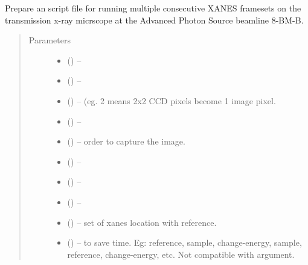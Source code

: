 \documentclass[letterpaper,10pt,english]{sphinxmanual}
\begin{document}
\begin{fulllineitems}
\label{\detokenize{xanespy:xanespy.beamlines.sector8_xanes_script}}
Prepare an script file for running multiple consecutive XANES
framesets on the transmission x-ray micrscope at the Advanced
Photon Source beamline 8-BM-B.
\begin{quote}\begin{description}
\item[{Parameters}] \leavevmode\begin{itemize}
\item {} 
 (\sphinxstyleliteralemphasis{-}) -- 

\item {} 
 (\sphinxstyleliteralemphasis{-}) -- 

\item {} 
 (\sphinxstyleliteralemphasis{-}) -- (eg. 2 means 2x2 CCD pixels become 1 image pixel.

\item {} 
 (\sphinxstyleliteralemphasis{-}) -- 

\item {} 
 (\sphinxstyleliteralemphasis{-}) -- order to capture the image.

\item {} 
 (\sphinxstyleliteralemphasis{-}) -- 

\item {} 
 (\sphinxstyleliteralemphasis{-}) -- 

\item {} 
 (\sphinxstyleliteralemphasis{-}) -- 

\item {} 
 (\sphinxstyleliteralemphasis{-}) -- set of xanes location with reference.

\item {} 
 (\sphinxstyleliteralemphasis{-}) -- to save time. Eg: reference, sample, change-energy, sample,
reference, change-energy, etc. Not compatible with 
argument.

\end{itemize}

\end{description}\end{quote}

\end{fulllineitems}
\end{document}
